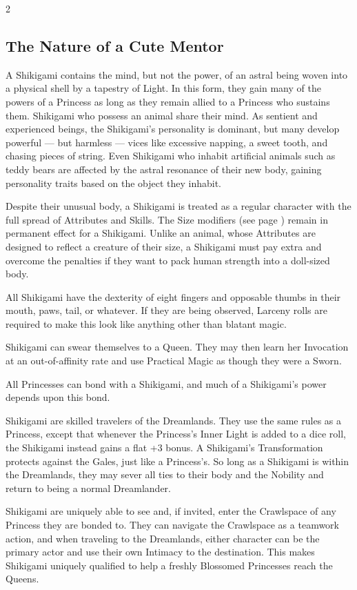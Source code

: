 \begin{multicols}{2}
\subsection*{The Nature of a Cute Mentor}

A Shikigami contains the mind, but not the power, of an astral being woven into a physical shell by a tapestry of Light. In this form, they gain many of the powers of a Princess as long as they remain allied to a Princess who sustains them. Shikigami who possess an animal share their mind. As sentient and experienced beings, the Shikigami's personality is dominant, but many develop powerful — but harmless — vices like excessive napping, a sweet tooth, and chasing pieces of string. Even Shikigami who inhabit artificial animals such as teddy bears are affected by the astral resonance of their new body, gaining personality traits based on the object they inhabit. 

Despite their unusual body, a Shikigami is treated as a regular character with the full spread of Attributes and Skills. The Size modifiers (see page \pageref{SizeTable}) remain in permanent effect for a Shikigami. Unlike an animal, whose Attributes are designed to reflect a creature of their size, a Shikigami must pay extra and overcome the penalties if they want to pack human strength into a doll-sized body.

All Shikigami have the dexterity of eight fingers and opposable thumbs in their mouth, paws, tail, or whatever. If they are being observed, Larceny rolls are required to make this look like anything other than blatant magic.

Shikigami can swear themselves to a Queen. They may then learn her Invocation at an out-of-affinity rate and use Practical Magic as though they were a Sworn.

All Princesses can bond with a Shikigami, and much of a Shikigami's power depends upon this bond. 

Shikigami are skilled travelers of the Dreamlands. They use the same rules as a Princess, except that whenever the Princess's Inner Light is added to a dice roll, the Shikigami instead gains a flat +3 bonus. A Shikigami's Transformation protects against the Gales, just like a Princess's. So long as a Shikigami is within the Dreamlands, they may sever all ties to their body and the Nobility and return to being a normal Dreamlander. 

Shikigami are uniquely able to see and, if invited, enter the Crawlspace of any Princess they are bonded to. They can navigate the Crawlspace as a teamwork action, and when traveling to the Dreamlands, either character can be the primary actor and use their own Intimacy to the destination. This makes Shikigami uniquely qualified to help a freshly Blossomed Princesses reach the Queens.


\end{multicols}
